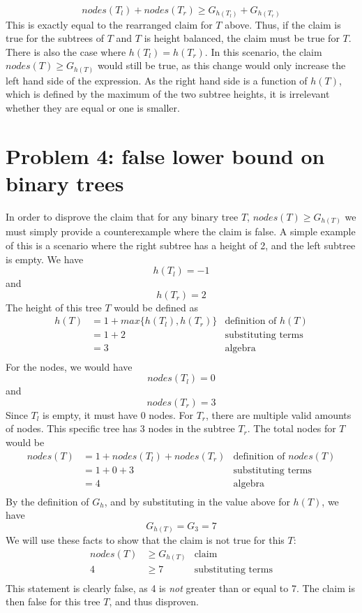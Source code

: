 \documentclass[titlepage]{article}
\begin{document}
$$nodes(T_l) + nodes(T_r) \geq G_{h(T_l)} + G_{h(T_r)}$$
This is exactly equal to the rearranged claim for $T$ above. Thus, if the claim is true for the subtrees of $T$ and $T$ is height balanced, the claim must be true for $T$. There is also the case where $h(T_l) = h(T_r)$. In this scenario, the claim $nodes(T) \geq G_{h(T)}$ would still be true, as this change would only increase the left hand side of the expression. As the right hand side is a function of $h(T)$, which is defined by the maximum of the two subtree heights, it is irrelevant whether they are equal or one is smaller.

\section{Problem 4: false lower bound on binary trees}

In order to disprove the claim that for any binary tree $T$, $nodes(T)\geq G_{h(T)}$ we must simply provide a counterexample where the claim is false. A simple example of this is a scenario where the right subtree has a height of 2, and the left subtree is empty. We have
$$h(T_l) = -1$$
and
$$h(T_r) = 2$$
The height of this tree $T$ would be defined as
\begin{align*}
h(T) &= 1 + max\{h(T_l), h(T_r)\}  & \text{definition of $h(T)$} \\
&= 1 + 2 & \text{substituting terms} \\
&= 3 & \text{algebra} \\
\end{align*}
For the nodes, we would have
$$nodes(T_l) = 0$$
and
$$nodes(T_r) = 3$$
Since $T_l$ is empty, it must have 0 nodes. For $T_r$, there are multiple valid amounts of nodes. This specific tree has 3 nodes in the subtree $T_r$. The total nodes for $T$ would be
\begin{align*}
nodes(T) &= 1 + nodes(T_l) + nodes(T_r)  & \text{definition of $nodes(T)$} \\
&= 1 + 0 + 3 & \text{substituting terms} \\
&= 4 & \text{algebra} \\
\end{align*}
By the definition of $G_h$, and by substituting in the value above for $h(T)$, we have
$$G_{h(T)} = G_3 = 7$$
We will use these facts to show that the claim is not true for this $T$:
\begin{align*}
nodes(T) &\geq G_{h(T)}  & \text{claim} \\
4 &\geq 7 & \text{substituting terms} \\
\end{align*}
This statement is clearly false, as 4 is \textit{not} greater than or equal to 7. The claim is then false for this tree $T$, and thus disproven.
\end{document}
